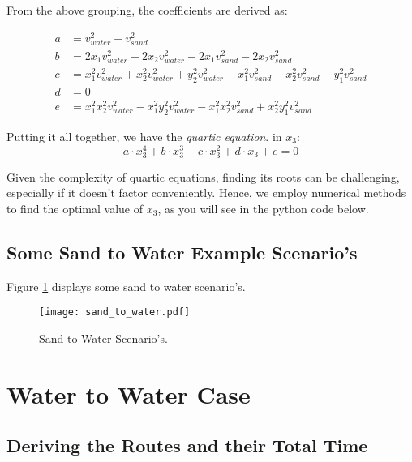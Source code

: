 \documentclass[11pt, a4paper]{article}
\begin{document}
From the above grouping, the coefficients are derived as:

\begin{align*}
a & = v_{water}^2 - v_{sand}^2 \\
b & = 2x_1v_{water}^2 + 2x_2v_{water}^2 - 2x_1v_{sand}^2 - 2x_2v_{sand}^2 \\
c & = x_1^2v_{water}^2 + x_2^2v_{water}^2 + y_2^2v_{water}^2 - x_1^2v_{sand}^2 - x_2^2v_{sand}^2 - y_1^2v_{sand}^2 \\
d & = 0 \\
e & = x_1^2x_2^2v_{water}^2 - x_1^2y_2^2v_{water}^2 - x_1^2x_2^2v_{sand}^2 + x_2^2y_1^2v_{sand}^2
\end{align*}

Putting it all together, we have the \emph{quartic equation}. in \( x_3 \):
\[ a \cdot x_3^4 + b \cdot x_3^3 + c \cdot x_3^2 + d \cdot x_3 + e = 0 \]

Given the complexity of quartic equations, finding its roots can be challenging,
especially if it doesn't factor conveniently.
Hence, we employ numerical methods to find the optimal value of \( x_3 \), as you will see in the python code below.

\subsection{Some Sand to Water Example Scenario's}

Figure \ref{fig:sand_to_water} displays some sand to water scenario's.

\begin{figure}[htbp] %
    \centering %
    \texttt{[image: sand\_to\_water.pdf]} %
    \caption{Sand to Water Scenario's.} %
    \label{fig:sand_to_water} %
\end{figure}



\section{Water to Water Case}

\subsection{Deriving the Routes and their Total Time}
\end{document}
